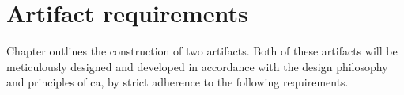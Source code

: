 \section{Artifact requirements} \label{sec_artifact_requirements}

Chapter  outlines the construction of two artifacts. Both
of these artifacts will be meticulously designed and developed in accordance with the
design philosophy and principles of \gls{ca}, by strict adherence to the following
requirements.





